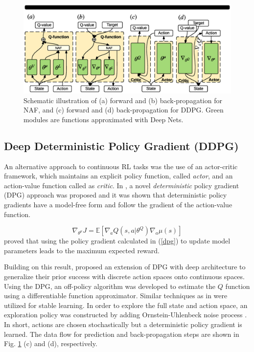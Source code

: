 \documentclass[../thesis.tex]{subfiles}
\begin{document}
\begin{figure}[t]
	\begin{center}
	\centerline{\includegraphics[width=0.8\columnwidth,trim= 80 900 110 70, clip=true]{./MultimodalDRL/fig/naf_ddpg}}
	\caption{Schematic illustration of (a) forward and (b) back-propagation for NAF, and (c) forward and (d) back-propagation for DDPG. Green modules are functions approximated with Deep Nets.}
	\label{fig:CDQN-DDPG}
	\end{center}
\end{figure} 

\subsection{Deep Deterministic Policy Gradient (DDPG)}
An alternative approach to continuous RL tasks was the use of an actor-critic framework, which maintains an explicit policy function, called \textit{actor}, and an action-value function called as \textit{critic}. In \citet{dpg}, a novel \emph{deterministic} policy gradient (DPG) approach was proposed and it was shown that deterministic policy gradients have a model-free form and follow the gradient of the action-value function. 

\begin{equation}
\nabla_{\theta^\mu} J = \mathbb{E}[\nabla_a Q(s,a|\theta^Q) \nabla_a \mu(s)]
\label{dpg}
\end{equation}
\citet{dpg} proved that using the policy gradient calculated in (\ref{dpg}) to update model parameters leads to the maximum expected reward.

Building on this result, \citet{DBLP:journals/corr/LillicrapHPHETS15} proposed an extension of DPG with deep architecture to generalize their prior success with discrete action spaces \cite{mnih2015human} onto continuous spaces. Using the DPG, an off-policy algorithm was developed to estimate the $Q$ function using a differentiable function approximator. Similar techniques as in \cite{mnih2015human} were utilized for stable learning. In order to explore the full state and action space, an exploration policy was constructed by adding Ornstein-Uhlenbeck noise process \cite{uhlenbeck1930theory}. In short, actions are chosen stochastically but a deterministic policy gradient is learned. The data flow for prediction and back-propagation steps are shown in Fig. \ref{fig:CDQN-DDPG} (c) and (d), respectively.
\end{document}
